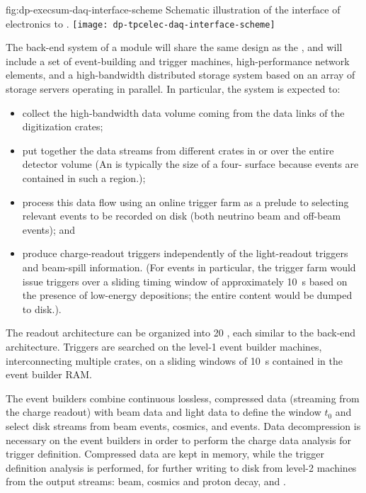\begin{dunefigure}{fig:dp-execsum-daq-interface-scheme}
{Schematic illustration of the interface of   electronics to .}
\texttt{[image: dp-tpcelec-daq-interface-scheme]}
\end{dunefigure}

The  back-end system of a  module will share the same design as the , and will include a set of event-building and trigger machines, high-performance network elements, and a high-bandwidth distributed storage system based on an array of storage servers operating in parallel. In particular, the  system is expected to:

\begin{itemize}
\item collect the high-bandwidth data volume coming from the data links of the  digitization crates; 
\item put together the data streams from different crates in  or over the entire detector volume (An  is typically the size of a  four- surface because events are contained in such a region.);
\item process this data flow using an online trigger farm  as a prelude to selecting relevant events to be recorded on disk (both neutrino beam and off-beam events); and 
\item produce charge-readout triggers independently of the light-readout triggers and beam-spill information. 
(For  events in particular, the trigger farm would issue triggers over a sliding timing window of approximately \SI{10}{s}  based on the presence of low-energy depositions; the entire content would be dumped to disk.).
\end{itemize}

The  readout architecture can be organized into \num{20} , each similar to the  back-end architecture. Triggers are searched on the level-1 event builder machines, interconnecting multiple  crates, on a sliding windows of \SI{10}{s}  contained in the event builder RAM.

The event builders combine continuous lossless, compressed data (streaming from the charge readout) with beam data and light data to define the window $t_0$ and select disk streams from beam events, cosmics, and  events. Data decompression is necessary on the event builders in order to perform the charge data analysis for trigger definition. Compressed data are kept in memory, while the trigger definition analysis is performed, for further writing to disk from level-2 machines from the output streams: beam, cosmics and proton decay, and . 

